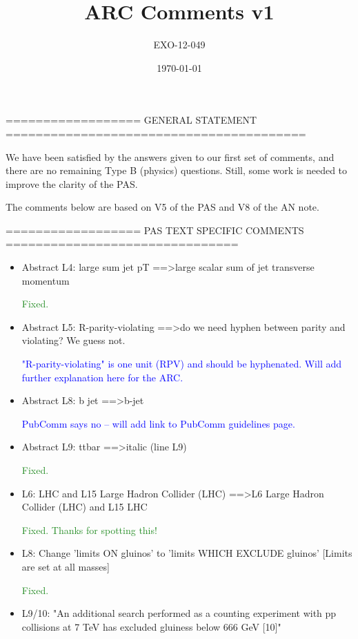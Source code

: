 \documentclass[paper=a4, fontsize=11pt]{scrartcl}
\title{ARC Comments v1}
\author{EXO-12-049}
\date{\today}
\begin{document}
================== GENERAL STATEMENT ======================================== 


We have been satisfied by the answers given to our first set of comments, and 
there are no remaining Type B (physics) questions. Still, some work is needed 
to improve the clarity of the PAS. 


The comments below are based on V5 of the PAS and V8 of the AN note. 


================== PAS TEXT SPECIFIC COMMENTS =============================== 

\begin{itemize}
\item Abstract L4: 
large sum jet pT ==\textgreater large scalar sum of jet transverse momentum 

\textcolor{ForestGreen}{Fixed.}\\

\item Abstract L5: 
R-parity-violating ==\textgreater do we need hyphen between parity and violating? We 
guess not. 

\textcolor{Blue}{"R-parity-violating" is one unit (RPV) and should be hyphenated. Will add
further explanation here for the ARC.}\\

\item Abstract L8: 
b jet ==\textgreater b-jet 

\textcolor{Blue}{PubComm says no -- will add link to PubComm guidelines page.}\\

\item Abstract L9: 
ttbar ==\textgreater italic (line L9) 

\textcolor{ForestGreen}{Fixed.}\\

\item L6: 
LHC and L15 Large Hadron Collider (LHC) 
==\textgreater L6 Large Hadron Collider (LHC) and L15 LHC 

\textcolor{ForestGreen}{Fixed. Thanks for spotting this!}\\

\item L8: 
Change 'limits ON gluinos' to 'limits WHICH EXCLUDE gluinos' 
[Limits are set at all masses] 

\textcolor{ForestGreen}{Fixed.}\\

\item L9/10: 
"An additional search performed as a counting experiment with pp collisions 
at 7 TeV has excluded gluiness below 666 GeV [10]" 


\end{itemize}
\end{document}
